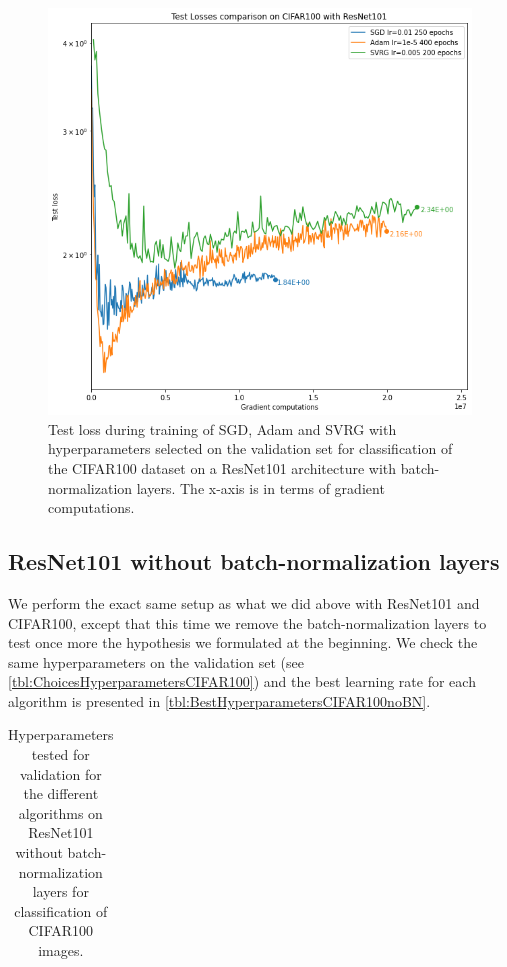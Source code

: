 \documentclass[a4paper,11pt,oneside]{report}
\begin{document}
\begin{figure}
    \centering
    \includegraphics[width=\columnwidth]{figures/ResNet101Results.png}
    \caption{Test loss during training of SGD, Adam and SVRG with hyperparameters selected on the validation set for classification of the CIFAR100 dataset on a ResNet101 architecture with batch-normalization layers. The x-axis is in terms of gradient computations.}
    \label{fig:ResNet101results}
\end{figure}





\subsection{ResNet101 without batch-normalization layers}\label{seq:ResNet101noBN}

We perform the exact same setup as what we did above with ResNet101 and CIFAR100, except that this time we remove the batch-normalization layers to test once more the hypothesis we formulated at the beginning. We check the same hyperparameters on the validation set (see \autoref{tbl:ChoicesHyperparametersCIFAR100}) and the best learning rate for each algorithm is presented in \autoref{tbl:BestHyperparametersCIFAR100noBN}.

\begin{table}
    \begin{center}
        \begin{tabular}{||c | c | l||}
             \hline
             
        \end{tabular}
    \end{center}
    \caption{Hyperparameters tested for validation for the different algorithms on ResNet101 without batch-normalization layers for classification of CIFAR100 images.
    }
    \label{tbl:BestHyperparametersCIFAR100noBN}
\end{table}
\end{document}
